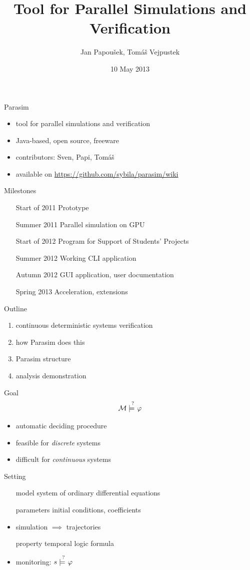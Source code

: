 \documentclass[xcolor=svgnames,14pt]{beamer}
\title[Parasim]{Tool for Parallel Simulations and Verification}
\author{Jan Papou\v{s}ek, Tom\'{a}\v{s} Vejpustek}
\institute{}
\date{10 May 2013}
\newcommand{\qmodels}{\models\hspace{-1.7ex}\raisebox{2.7mm}{\scriptsize?}\hspace{1ex}}
\begin{document}
\frame[plain]{\titlepage}

\begin{frame}{Parasim}%
	\begin{itemize}
		\item tool for parallel simulations and verification
		\item Java-based, open source, freeware
		\item contributors: Sven, Papi, Tom\'{a}\v{s}
		\item available on \mbox{\url{https://github.com/sybila/parasim/wiki}}
	\end{itemize}
\end{frame}%
\begin{frame}{Milestones}%
	\begin{itemize}
		\setlength\itemindent{20mm}
		\item[Start of 2011] Prototype
		\item[Summer 2011] Parallel simulation on GPU
		\item[Start of 2012] Program for Support of Students' Projects
		\item[Summer 2012] Working CLI application
		\item[Autumn 2012] GUI application, user documentation
		\item[Spring 2013] Acceleration, extensions
	\end{itemize}
\end{frame}%
\begin{frame}{Outline}%
	\begin{enumerate}
		\item continuous deterministic systems verification
		\item how Parasim does this
		\item Parasim structure
		\item analysis demonstration
	\end{enumerate}
\end{frame}%
\begin{frame}{Goal}%
	$$\mathcal{M}\qmodels\varphi$$
	\begin{itemize}
		\item automatic deciding procedure
		\item feasible for \emph{discrete} systems
		\item difficult for \emph{continuous} systems
	\end{itemize}
\end{frame}%
\begin{frame}{Setting}%
	\begin{itemize}
		\setlength\itemindent{15mm}
		\item[model] system of ordinary differential equations
		\item[parameters] initial conditions, coefficients
		\item simulation $\implies$ trajectories
		\item[property] temporal logic formula
		\item monitoring: $s\qmodels\varphi$
	\end{itemize}
\end{frame}%
\end{document}
